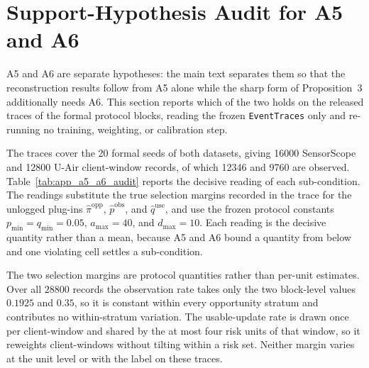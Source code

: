 \section{Support-Hypothesis Audit for A5 and A6}
\label{app:a5_a6_audit}

A5 and A6 are separate hypotheses: the main text separates them so that the
reconstruction results follow from A5 alone while the sharp form of
Proposition~3 additionally needs A6.  This section reports which of the two
holds on the released traces of the formal protocol blocks, reading the frozen
\texttt{EventTraces} only and re-running no training, weighting, or
calibration step.

The traces cover the 20 formal seeds of both datasets, giving 16000
SensorScope and 12800 U-Air client-window records, of which 12346 and 9760
are observed.  Table~\ref{tab:app_a5_a6_audit} reports the decisive reading of
each sub-condition.  The readings substitute the true selection margins
recorded in the trace for the unlogged plug-ins
$\widehat\pi^{\mathrm{opp}}$, $\widehat p^{\mathrm{obs}}$, and
$\widehat q^{\mathrm{use}}$, and use the frozen protocol constants
$p_{\min}=q_{\min}=0.05$, $a_{\max}=40$, and $d_{\max}=10$.  Each reading is
the decisive quantity rather than a mean, because A5 and A6 bound a quantity
from below and one violating cell settles a sub-condition.

The two selection margins are protocol quantities rather than per-unit
estimates.  Over all $28800$ records the observation rate takes only the two
block-level values $0.1925$ and $0.35$, so it is constant within every
opportunity stratum and contributes no within-stratum variation.  The
usable-update rate is drawn once per client-window and shared by the at most
four risk units of that window, so it reweights client-windows without tilting
within a risk set.  Neither margin varies at the unit level or with the label
on these traces.

